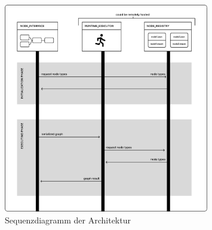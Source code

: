 \documentclass[ngerman]{article}
\begin{document}
\begin{figure}[htbp]
    \centering
    \includegraphics[width=0.8\textwidth]{graphics/OVERVIEW_SEQUENCE.pdf}
    \caption{Sequenzdiagramm der Architektur}
    \label{fig:your_label}
\end{figure}
\end{document}

